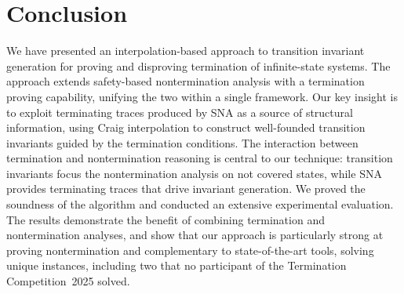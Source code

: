 \section{Conclusion}
\label{Sec:Conclusion}


We have presented an interpolation-based approach to transition 
invariant generation for proving and disproving termination of 
infinite-state systems. 
The approach extends safety-based nontermination analysis with a termination proving capability, 
unifying the two within a single framework. 
Our key insight is to exploit terminating traces produced by SNA
as a source of structural information, using Craig interpolation 
to construct well-founded transition invariants guided by the 
termination conditions. 
The interaction between termination and nontermination reasoning is central to our technique: 
transition invariants focus the nontermination analysis on not covered states,
while SNA provides terminating traces that drive invariant generation.
We proved the soundness of the algorithm and conducted an extensive
experimental evaluation. 
The results demonstrate the benefit of combining termination and nontermination analyses,
and show that our approach is particularly strong at proving nontermination and complementary to state-of-the-art tools,
solving unique instances, including two that no participant of the Termination Competition~2025 solved.



